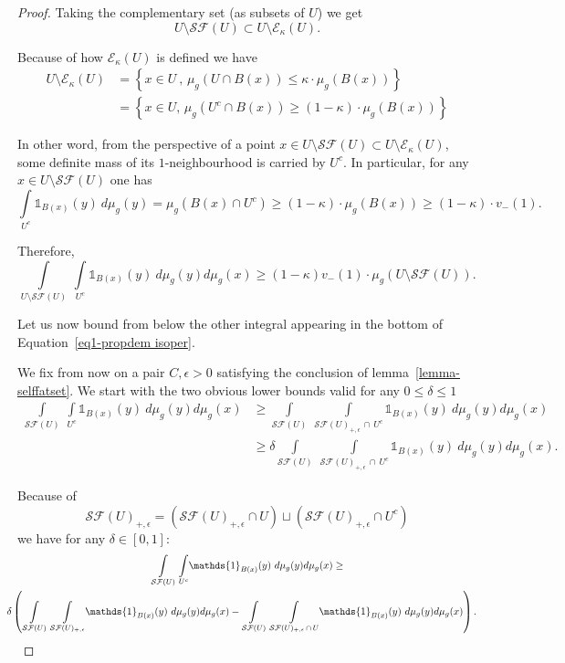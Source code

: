 \documentclass[AHL,Unicode,longabstracts,published]{cedram}
\newcommand{\dsun}{\mathds{1}}
\newcommand{\cE}{\mathcal{E}}
\newcommand{\cSF}{\mathcal{SF}}
\newcommand{\inte}[1]{\underset{#1}{\int}}
\begin{document}
\begin{proof}
Taking the complementary set (as subsets of $U$) we get
\[
U \setminus \cSF(U) \subset U \setminus \cE_{\kappa}(U) .
\]

Because of how $\cE_{\kappa}(U)$ is defined we have
\begin{align*}
U \setminus \cE_{\kappa}(U) & = \left\{ x \in U \ , \, \mu_g\left(U \cap B(x)\right) \le \kappa \cdot \mu_g(B(x))\right\} \\
& = \left\{ x \in U, \, \mu_g\left(U^c \cap B(x)\right) \ge (1- \kappa) \cdot \mu_g(B(x)) \right\}
\end{align*}

In other word, from the perspective of a point $x \in U \setminus \cSF(U) \subset U \setminus \cE_{\kappa}(U) $, some definite mass of its $1$-neighbourhood is carried by $U^c$. In particular, for any $x \in U \setminus \cSF(U) $ one has
\[
\inte{U^c} \dsun_{B(x)}(y) \ d \mu_g(y)
 = \mu_g\left(B(x)\cap U^c\right)  \ge (1- \kappa) \cdot \mu_g(B(x)) \ge (1- \kappa) \cdot v_-(1) .
\]

Therefore,
\begin{equation}\label{eq3-propdem isoper}
\inte{U \setminus \cSF(U)} \ \inte{U^c} \dsun_{B(x)}(y) \ d \mu_g(y) d \mu_g(x) \ge (1- \kappa) v_-(1) \cdot \mu_g(U \setminus \cSF(U)) .
\end{equation}


Let us now bound from below the other integral appearing in the bottom of Equation~\eqref{eq1-propdem isoper}. 

We fix from now on a pair $C, \epsilon > 0$ satisfying the conclusion of lemma~\ref{lemma-selffatset}. We start with the two obvious lower bounds valid for any $ 0 \le \delta \le 1$
\begin{align*}
\inte{\cSF(U)} \ \inte{U^c} \dsun_{B(x)}(y) \ d \mu_g(y) d \mu_g(x) & \ge \inte{ \cSF(U)} \ \inte{\cSF(U)_{+, \epsilon}\,\cap\,U^c} \dsun_{B(x)}(y) \ d \mu_g(y) d \mu_g(x) \\
& \ge \delta \inte{\cSF(U)} \ \inte{ \cSF(U)_{+, \epsilon}\,\cap\,U^c} \dsun_{B(x)}(y) \ d \mu_g(y) d \mu_g(x). 
\end{align*}

Because of
\[
\cSF(U)_{+, \epsilon} = \left(\cSF(U)_{+, \epsilon} \cap U\right) \sqcup \left(\cSF(U)_{+, \epsilon} \cap U^c\right)
\]
we have for any $\delta \in [0,1]$:
\begin{multline}\label{eq2-propdem isoper}
\inte{\cSF(U)} \ \inte{U^c} \dsun_{B(x)}(y) \ d \mu_g(y) d \mu_g(x)\ge \\
\mkern-20mu\delta \left(\inte{\cSF(U)} \ \inte{\cSF(U)_{+, \epsilon}} \dsun_{B(x)}(y) \ d \mu_g(y) d \mu_g(x)- \inte{\cSF(U)} \ \inte{ \cSF(U)_{+, \epsilon}\,\cap\,U} \dsun_{B(x)}(y) \ d \mu_g(y) d \mu_g(x) \right) .
\end{multline}



\end{proof}
\end{document}
